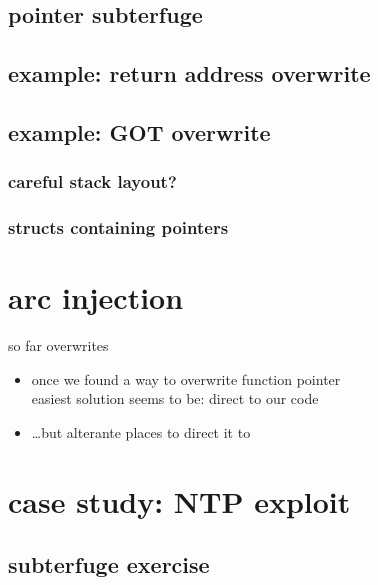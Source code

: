 \subsection{pointer subterfuge}


\subsection{example: return address overwrite}


\subsection{example: GOT overwrite}


\subsubsection{careful stack layout?}


\subsubsection{structs containing pointers}


\section{arc injection}
\begin{frame}{so far overwrites}
    \begin{itemize}
    \item once we found a way to overwrite function pointer\\
          easiest solution seems to be: direct to our code
    \item \ldots but alterante places to direct it to
    \end{itemize}
\end{frame}



\section{case study: NTP exploit}


\subsection{subterfuge exercise}


